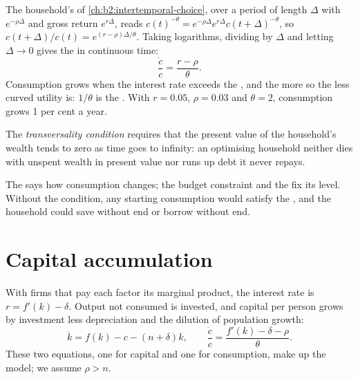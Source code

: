 The household's  of \cref{ch:b2:intertemporal-choice}, over a period of length $\Delta$ with  $e^{-\rho\Delta}$ and gross return $e^{r\Delta}$, reads $c(t)^{-\theta} = e^{-\rho\Delta}e^{r\Delta}c(t + \Delta)^{-\theta}$, so
$c(t + \Delta)/c(t) = e^{(r - \rho)\Delta/\theta}$. Taking logarithms, dividing by $\Delta$ and letting $\Delta \to 0$ gives the  in continuous time:
\begin{equation}\label{eq:b2:ramsey-model:euler}
\frac{\dot c}{c} = \frac{r - \rho}{\theta}.
\end{equation}
Consumption grows when the interest rate exceeds the , and the more so the less curved utility is:
$1/\theta$ is the . With $r = 0.05$, $\rho = 0.03$ and $\theta = 2$, consumption grows 1 per cent a year.

\begin{definition}\label{def:b2:ramsey-model:transversality}
The \emph{transversality condition} requires that the present value of the household's
wealth tends to zero as time goes to infinity: an optimising household neither dies with unspent wealth in present value
nor runs up debt it never repays.
\end{definition}

The  says how consumption changes; the budget constraint and the  fix its level.
Without the condition, any starting consumption would satisfy the , and the household could save without
end or borrow without end.

\section{Capital accumulation}\label{sec:b2:ramsey-model:capital}

With firms that pay each factor its marginal product, the interest rate is $r = f'(k) - \delta$. Output not consumed is invested, and capital per
person grows by investment less depreciation and the dilution of population growth:
\begin{equation}\label{eq:b2:ramsey-model:k}
\dot k = f(k) - c - (n + \delta)k, \qquad \frac{\dot c}{c} = \frac{f'(k) - \delta - \rho}{\theta}.
\end{equation}
These two equations, one for capital and one for consumption, make up the model; we assume $\rho > n$.

